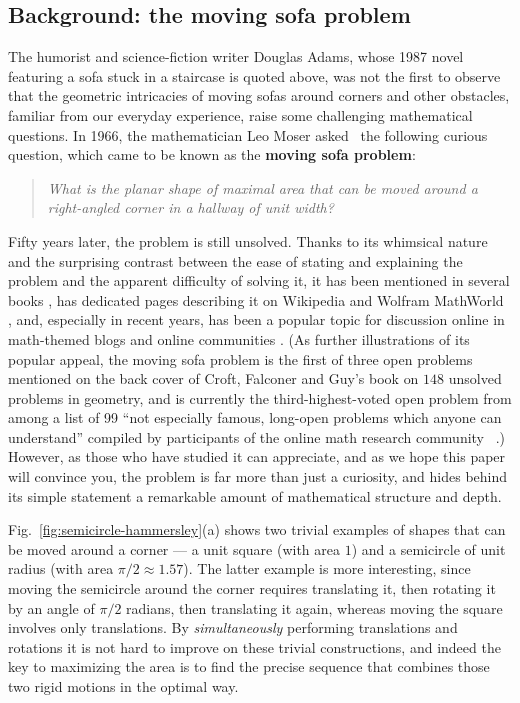 \documentclass[11pt]{article}
\begin{document}
\subsection{Background: the moving sofa problem}

The humorist and science-fiction writer Douglas Adams, whose 1987 novel \cite{adams} featuring a sofa stuck in a staircase is quoted above, was not the first to observe that the geometric intricacies of moving sofas around corners and other obstacles, familiar from our everyday experience, raise some challenging mathematical questions. In 1966, the mathematician Leo Moser asked~\cite{moser} the following curious question, which came to be known as the \textbf{moving sofa problem}:

\begin{quote}
\textit{What is the planar shape of maximal area that can be moved around a right-angled corner in a hallway of unit width?}
\end{quote}


Fifty years later, the problem is still unsolved. Thanks to its whimsical nature and the surprising contrast between the ease of stating and explaining the problem and the apparent difficulty of solving it, it has been mentioned in several books \cite{unsolved-problems, finch, stewart, weisstein}, 
has dedicated pages describing it on Wikipedia \cite{wikipedia} and Wolfram MathWorld \cite{mathworld}, 
and, especially in recent years, has been a popular topic for discussion online in math-themed blogs \cite{baez1, baez2, goucher, pachter, ross} and online communities \cite{reddit, mathoverflow}. 
(As further illustrations of its popular appeal, the moving sofa problem is the first of three open problems mentioned on the back cover of Croft, Falconer and Guy's book \cite{unsolved-problems} on $148$ unsolved problems in geometry, and is currently the third-highest-voted open problem from among a list of 99 ``not especially famous, long-open problems which anyone can understand'' compiled by participants of the online math research community ~\cite{mathoverflow}.)
However, as those who have studied it can appreciate, and as we hope this paper will convince you, the problem is far more than just a curiosity, and hides behind its simple statement a remarkable amount of mathematical structure and depth.

Fig.~\ref{fig:semicircle-hammersley}(a) shows two trivial examples of shapes that can be moved around a corner --- a unit square (with area $1$) and a semicircle of unit radius (with area $\pi/2 \approx 1.57$). The latter example is more interesting, since moving the semicircle around the corner requires translating it, then rotating it by an angle of $\pi/2$ radians, then translating it again, whereas moving the square involves only translations. By \emph{simultaneously} performing translations and rotations it is not hard to improve on these trivial constructions, and indeed the key to maximizing the area is to find the precise sequence that combines those two rigid motions in the optimal way.
\end{document}
